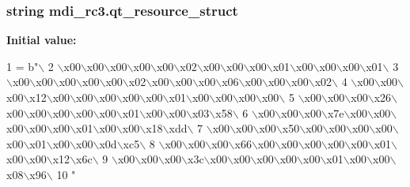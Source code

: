 \subsubsection[{qt\+\_\+resource\+\_\+struct}]{\setlength{\rightskip}{0pt plus 5cm}string mdi\+\_\+rc3.\+qt\+\_\+resource\+\_\+struct}\label{namespacemdi__rc3_a9825a7d2623689a080f82d499f79e254}
{\bfseries Initial value\+:}
\begin{DoxyCode}
1 = b\textcolor{stringliteral}{"\(\backslash\)}
2 \textcolor{stringliteral}{\(\backslash\)x00\(\backslash\)x00\(\backslash\)x00\(\backslash\)x00\(\backslash\)x00\(\backslash\)x02\(\backslash\)x00\(\backslash\)x00\(\backslash\)x00\(\backslash\)x01\(\backslash\)x00\(\backslash\)x00\(\backslash\)x00\(\backslash\)x01\(\backslash\)}
3 \textcolor{stringliteral}{\(\backslash\)x00\(\backslash\)x00\(\backslash\)x00\(\backslash\)x00\(\backslash\)x00\(\backslash\)x02\(\backslash\)x00\(\backslash\)x00\(\backslash\)x00\(\backslash\)x06\(\backslash\)x00\(\backslash\)x00\(\backslash\)x00\(\backslash\)x02\(\backslash\)}
4 \textcolor{stringliteral}{\(\backslash\)x00\(\backslash\)x00\(\backslash\)x00\(\backslash\)x12\(\backslash\)x00\(\backslash\)x00\(\backslash\)x00\(\backslash\)x00\(\backslash\)x00\(\backslash\)x01\(\backslash\)x00\(\backslash\)x00\(\backslash\)x00\(\backslash\)x00\(\backslash\)}
5 \textcolor{stringliteral}{\(\backslash\)x00\(\backslash\)x00\(\backslash\)x00\(\backslash\)x26\(\backslash\)x00\(\backslash\)x00\(\backslash\)x00\(\backslash\)x00\(\backslash\)x00\(\backslash\)x01\(\backslash\)x00\(\backslash\)x00\(\backslash\)x03\(\backslash\)x58\(\backslash\)}
6 \textcolor{stringliteral}{\(\backslash\)x00\(\backslash\)x00\(\backslash\)x00\(\backslash\)x7e\(\backslash\)x00\(\backslash\)x00\(\backslash\)x00\(\backslash\)x00\(\backslash\)x00\(\backslash\)x01\(\backslash\)x00\(\backslash\)x00\(\backslash\)x18\(\backslash\)xdd\(\backslash\)}
7 \textcolor{stringliteral}{\(\backslash\)x00\(\backslash\)x00\(\backslash\)x00\(\backslash\)x50\(\backslash\)x00\(\backslash\)x00\(\backslash\)x00\(\backslash\)x00\(\backslash\)x00\(\backslash\)x01\(\backslash\)x00\(\backslash\)x00\(\backslash\)x0d\(\backslash\)xc5\(\backslash\)}
8 \textcolor{stringliteral}{\(\backslash\)x00\(\backslash\)x00\(\backslash\)x00\(\backslash\)x66\(\backslash\)x00\(\backslash\)x00\(\backslash\)x00\(\backslash\)x00\(\backslash\)x00\(\backslash\)x01\(\backslash\)x00\(\backslash\)x00\(\backslash\)x12\(\backslash\)x6c\(\backslash\)}
9 \textcolor{stringliteral}{\(\backslash\)x00\(\backslash\)x00\(\backslash\)x00\(\backslash\)x3c\(\backslash\)x00\(\backslash\)x00\(\backslash\)x00\(\backslash\)x00\(\backslash\)x00\(\backslash\)x01\(\backslash\)x00\(\backslash\)x00\(\backslash\)x08\(\backslash\)x96\(\backslash\)}
10 \textcolor{stringliteral}{"}
\end{DoxyCode}

